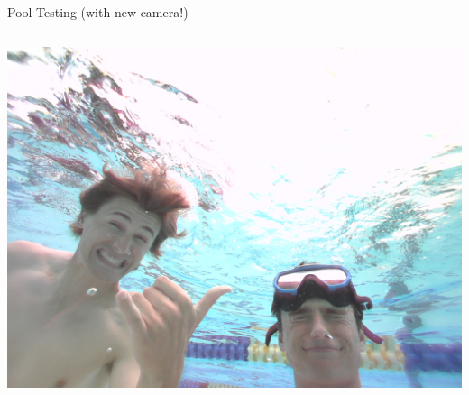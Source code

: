 \begin{frame}{Pool Testing (with new camera!)}
\begin{columns}[c]
        \centering
        \includegraphics[width=\linewidth]{images/frame_02357.png}
    \end{columns}
\end{frame}
